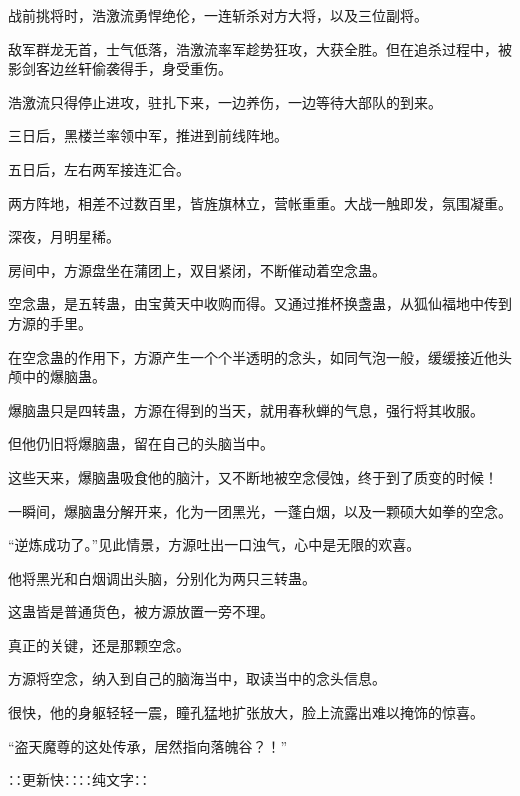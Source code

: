 \begin{this_body}
战前挑将时，浩激流勇悍绝伦，一连斩杀对方大将，以及三位副将。

敌军群龙无首，士气低落，浩激流率军趁势狂攻，大获全胜。但在追杀过程中，被影剑客边丝轩偷袭得手，身受重伤。

浩激流只得停止进攻，驻扎下来，一边养伤，一边等待大部队的到来。

三日后，黑楼兰率领中军，推进到前线阵地。

五日后，左右两军接连汇合。

两方阵地，相差不过数百里，皆旌旗林立，营帐重重。大战一触即发，氛围凝重。

深夜，月明星稀。

房间中，方源盘坐在蒲团上，双目紧闭，不断催动着空念蛊。

空念蛊，是五转蛊，由宝黄天中收购而得。又通过推杯换盏蛊，从狐仙福地中传到方源的手里。

在空念蛊的作用下，方源产生一个个半透明的念头，如同气泡一般，缓缓接近他头颅中的爆脑蛊。

爆脑蛊只是四转蛊，方源在得到的当天，就用春秋蝉的气息，强行将其收服。

但他仍旧将爆脑蛊，留在自己的头脑当中。

这些天来，爆脑蛊吸食他的脑汁，又不断地被空念侵蚀，终于到了质变的时候！

一瞬间，爆脑蛊分解开来，化为一团黑光，一蓬白烟，以及一颗硕大如拳的空念。

“逆炼成功了。”见此情景，方源吐出一口浊气，心中是无限的欢喜。

他将黑光和白烟调出头脑，分别化为两只三转蛊。

这蛊皆是普通货色，被方源放置一旁不理。

真正的关键，还是那颗空念。

方源将空念，纳入到自己的脑海当中，取读当中的念头信息。

很快，他的身躯轻轻一震，瞳孔猛地扩张放大，脸上流露出难以掩饰的惊喜。

“盗天魔尊的这处传承，居然指向落魄谷？！”

∷更新快∷∷纯文字∷

\end{this_body}

